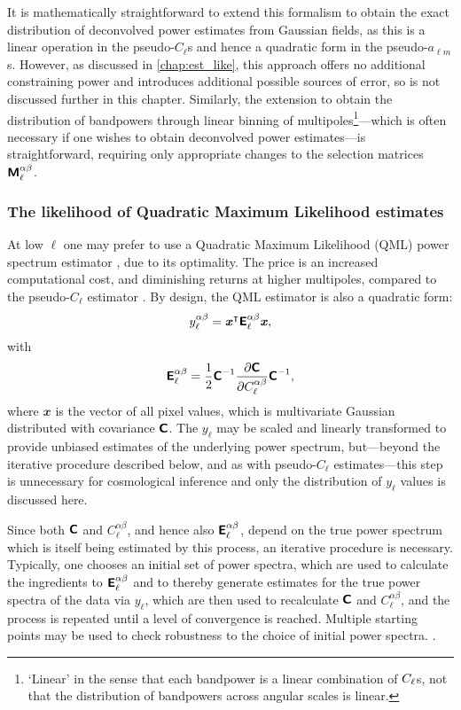 It is mathematically straightforward to extend this formalism to obtain the exact distribution of deconvolved power estimates from Gaussian fields, as this is a linear operation in the pseudo-$C_\ell$s and hence a quadratic form in the pseudo-$a_{\ell m}$s. However, as discussed in \autoref{chap:est_like}, this approach offers no additional constraining power and introduces additional possible sources of error, so is not discussed further in this chapter. Similarly, the extension to obtain the distribution of bandpowers through linear binning of multipoles\footnote{`Linear' in the sense that each bandpower is a linear combination of $C_\ell$s, not that the distribution of bandpowers across angular scales is linear.}---which is often necessary if one wishes to obtain deconvolved power estimates---is straightforward, requiring only appropriate changes to the selection matrices $\bm{\mathsf{M}}_\ell^{\alpha \beta}$.

\subsubsection{The likelihood of Quadratic Maximum Likelihood estimates}

At low $\ell$ one may prefer to use a Quadratic Maximum Likelihood (QML) power spectrum estimator \citep{Tegmark1997}, due to its optimality. The price is an increased computational cost, and diminishing returns at higher multipoles, compared to the pseudo-$C_\ell$ estimator \citep{Efstathiou2004}. By design, the QML estimator is also a quadratic form:
\begin{equation}
y_\ell^{\alpha \beta} =
\bm{\mathit{x}}^\intercal \bm{\mathsf{E}}_\ell^{\alpha \beta} \bm{\mathit{x}},
\label{el_Eqn:qml_estimator}
\end{equation}
with
\begin{equation}
\bm{\mathsf{E}}_\ell^{\alpha \beta} = \frac{1}{2} \bm{\mathsf{C}}^{-1}
\frac{\partial \bm{\mathsf{C}}}
{\partial C_\ell^{\alpha \beta}} \bm{\mathsf{C}}^{-1},
\end{equation}
where $\mathbfit{x}$ is the vector of all pixel values, which is multivariate Gaussian distributed with covariance $\bm{\mathsf{C}}$.
The $y_\ell$ may be scaled and linearly transformed to provide unbiased estimates of the underlying power spectrum, but---beyond the iterative procedure described below, and as with pseudo-$C_\ell$ estimates---this step is unnecessary for cosmological inference and only the distribution of $y_\ell$ values is discussed here.

Since both $\bm{\mathsf{C}}$ and $C_\ell^{\alpha \beta}$, and hence also $\bm{\mathsf{E}}_\ell^{\alpha \beta}$, depend on the true power spectrum which is itself being estimated by this process, an iterative procedure is necessary. Typically, one chooses an initial set of power spectra, which are used to calculate the ingredients to $\bm{\mathsf{E}}_\ell^{\alpha \beta}$ and to thereby generate estimates for the true power spectra of the data via $y_\ell$, which are then used to recalculate $\bm{\mathsf{C}}$ and $C_\ell^{\alpha \beta}$, and the process is repeated until a level of convergence is reached. Multiple starting points may be used to check robustness to the choice of initial power spectra. \citep[See e.g.][for more details]{Bond1998}.

